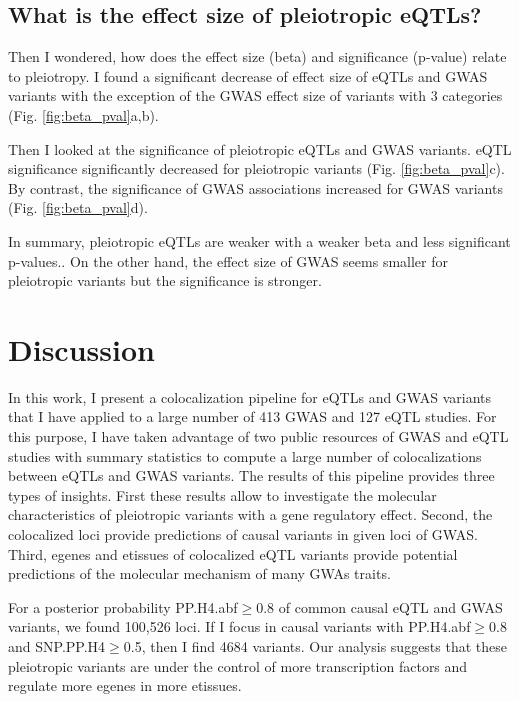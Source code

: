\subsection*{What is the effect size of pleiotropic eQTLs?}

Then I wondered, how does the effect size (beta) and significance (p-value) relate to pleiotropy.
%
I found a significant decrease of effect size of eQTLs and GWAS variants with the exception of the GWAS effect size of variants with 3 categories (Fig. \ref{fig:beta_pval}a,b).

Then I looked at the significance of pleiotropic eQTLs and GWAS variants.
%
eQTL significance significantly decreased for pleiotropic variants (Fig. \ref{fig:beta_pval}c).
%
By contrast, the significance of GWAS associations increased for GWAS variants (Fig. \ref{fig:beta_pval}d).

In summary, pleiotropic eQTLs are weaker with a weaker beta and less significant p-values..
%
On the other hand, the effect size of GWAS seems smaller for pleiotropic variants but the significance is stronger.

\section*{Discussion}

In this work, I present a colocalization pipeline for eQTLs and GWAS variants that I have applied to a large number of 413 GWAS and 127 eQTL studies.
%
For this purpose, I have taken advantage of two public resources of GWAS and eQTL studies with summary statistics to compute a large number of colocalizations between eQTLs and GWAS variants.
%
The results of this pipeline provides three types of insights.
%
First these results allow to investigate the molecular characteristics of pleiotropic variants with a gene regulatory effect.
%
Second, the colocalized loci provide predictions of causal variants in given loci of GWAS.
%
Third, egenes and etissues of colocalized eQTL variants provide potential predictions of the molecular mechanism of many GWAs traits.


For a posterior probability PP.H4.abf$\ge$0.8 of common causal eQTL and GWAS variants, we found 100,526 loci.
%
If I focus in causal variants with PP.H4.abf$\ge$0.8 and SNP.PP.H4$\ge$0.5, then I find 4684 variants.
%
Our analysis suggests that these pleiotropic variants are under the control of more transcription factors and regulate more egenes in more etissues.

